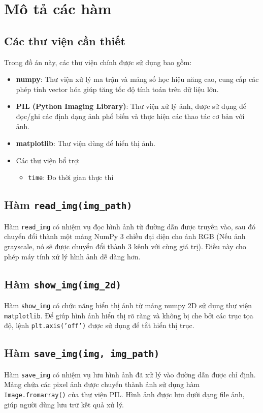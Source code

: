 \section{Mô tả các hàm}
\subsection{Các thư viện cần thiết}
Trong đồ án này, các thư viện chính được sử dụng bao gồm:
\begin{itemize}
	\item \textbf{numpy}: Thư viện xử lý ma trận và mảng số học hiệu năng cao, cung cấp các phép tính vector hóa giúp tăng tốc độ tính toán trên dữ liệu lớn.
	\item \textbf{PIL (Python Imaging Library)}: Thư viện xử lý ảnh, được sử dụng để đọc/ghi các định dạng ảnh phổ biến và thực hiện các thao tác cơ bản với ảnh.
	\item \textbf{matplotlib}: Thư viện dùng để hiển thị ảnh.

	\item Các thư viện bổ trợ:
	      \begin{itemize}
		      \item \texttt{time}: Đo thời gian thực thi
	      \end{itemize}
\end{itemize}

\subsection{Hàm \texttt{read\_img(img\_path)}}
Hàm \texttt{read\_img} có nhiệm vụ đọc hình ảnh từ đường dẫn được truyền vào, sau đó chuyển đổi thành một mảng NumPy 3 chiều đại diện cho ảnh RGB (Nếu ảnh grayscale, nó sẽ được chuyển đổi thành 3 kênh với cùng giá trị). Điều này cho phép máy tính xử lý hình ảnh dễ dàng hơn.

\subsection{Hàm \texttt{show\_img(img\_2d)}}
Hàm \texttt{show\_img} có chức năng hiển thị ảnh từ mảng numpy 2D sử dụng thư viện \texttt{matplotlib}. Để giúp hình ảnh hiển thị rõ ràng và không bị che bởi các trục tọa độ, lệnh \texttt{plt.axis('off')} được sử dụng để tắt hiển thị trục.

\subsection{Hàm \texttt{save\_img(img, img\_path)}}
Hàm \texttt{save\_img} có nhiệm vụ lưu hình ảnh đã xử lý vào đường dẫn được chỉ định. Mảng chứa các pixel ảnh được chuyển thành ảnh sử dụng hàm \texttt{Image.fromarray()} của thư viện PIL. Hình ảnh được lưu dưới dạng file ảnh, giúp người dùng lưu trữ kết quả xử lý.

